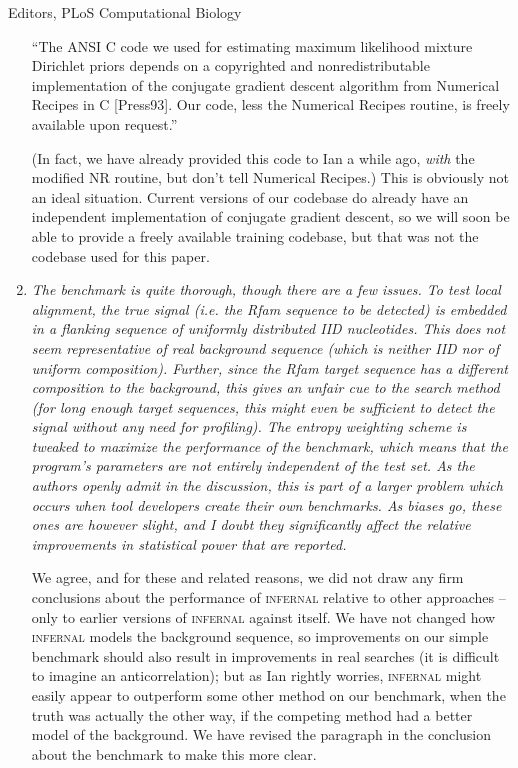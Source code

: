 \documentclass{jfrcletter}
\begin{document}
\begin{letter}{Editors, PLoS Computational Biology}
\begin{enumerate}
    ``The ANSI C code we used for estimating maximum likelihood
    mixture Dirichlet priors depends on a copyrighted and
    nonredistributable implementation of the conjugate gradient
    descent algorithm from Numerical Recipes in C [Press93]. Our
    code, less the Numerical Recipes routine, is freely available upon
    request.''

   (In fact, we have already provided this code to Ian a while ago,
    \emph{with} the modified NR routine, but don't tell Numerical
    Recipes.)  This is obviously not an ideal situation. Current
    versions of our codebase do already have an independent
    implementation of conjugate gradient descent, so we will soon be
    able to provide a freely available training codebase, but that was
    not the codebase used for this paper.

\item \emph{\footnotesize The benchmark is quite thorough, though there are a few
   issues. To test local alignment, the true signal (i.e. the Rfam
   sequence to be detected) is embedded in a flanking sequence of
   uniformly distributed IID nucleotides. This does not seem
   representative of real background sequence (which is neither IID
   nor of uniform composition). Further, since the Rfam target
   sequence has a different composition to the background, this gives
   an unfair cue to the search method (for long enough target
   sequences, this might even be sufficient to detect the signal
   without any need for profiling). The entropy weighting scheme is
   tweaked to maximize the performance of the benchmark, which means
   that the program's parameters are not entirely independent of the
   test set.  As the authors openly admit in the discussion, this is
   part of a larger problem which occurs when tool developers create
   their own benchmarks.  As biases go, these ones are however slight,
   and I doubt they significantly affect the relative improvements in
   statistical power that are reported.}

   We agree, and for these and related reasons, we did not draw any
   firm conclusions about the performance of \textsc{infernal}
   relative to other approaches -- only to earlier versions of
   \textsc{infernal} against itself. We have not changed how
   \textsc{infernal} models the background sequence, so improvements
   on our simple benchmark should also result in improvements in real
   searches (it is difficult to imagine an anticorrelation); but as
   Ian rightly worries, \textsc{infernal} might easily appear to
   outperform some other method on our benchmark, when the truth was
   actually the other way, if the competing method had a better model
   of the background. We have revised the paragraph in the conclusion
   about the benchmark to make this more clear.


\end{enumerate}
\end{letter}
\end{document}
